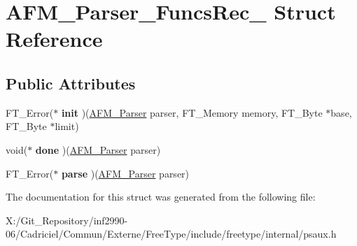 \hypertarget{struct_a_f_m___parser___funcs_rec__}{\section{A\-F\-M\-\_\-\-Parser\-\_\-\-Funcs\-Rec\-\_\- Struct Reference}
\label{struct_a_f_m___parser___funcs_rec__}
}
\subsection*{Public Attributes}
\begin{DoxyCompactItemize}
\item 
\hypertarget{struct_a_f_m___parser___funcs_rec___a7d5c1422c71ef00984f1207ebfb0b082}{F\-T\-\_\-\-Error($\ast$ {\bfseries init} )(\hyperlink{struct_a_f_m___parser_rec__}{A\-F\-M\-\_\-\-Parser} parser, F\-T\-\_\-\-Memory memory, F\-T\-\_\-\-Byte $\ast$base, F\-T\-\_\-\-Byte $\ast$limit)}\label{struct_a_f_m___parser___funcs_rec___a7d5c1422c71ef00984f1207ebfb0b082}

\item 
\hypertarget{struct_a_f_m___parser___funcs_rec___af4e8bc33b14d14b47d13caf0a2449d1b}{void($\ast$ {\bfseries done} )(\hyperlink{struct_a_f_m___parser_rec__}{A\-F\-M\-\_\-\-Parser} parser)}\label{struct_a_f_m___parser___funcs_rec___af4e8bc33b14d14b47d13caf0a2449d1b}

\item 
\hypertarget{struct_a_f_m___parser___funcs_rec___a2cd41be89cf12f9227c6f18220cbe2f3}{F\-T\-\_\-\-Error($\ast$ {\bfseries parse} )(\hyperlink{struct_a_f_m___parser_rec__}{A\-F\-M\-\_\-\-Parser} parser)}\label{struct_a_f_m___parser___funcs_rec___a2cd41be89cf12f9227c6f18220cbe2f3}

\end{DoxyCompactItemize}


The documentation for this struct was generated from the following file\-:\begin{DoxyCompactItemize}
\item 
X\-:/\-Git\-\_\-\-Repository/inf2990-\/06/\-Cadriciel/\-Commun/\-Externe/\-Free\-Type/include/freetype/internal/psaux.\-h\end{DoxyCompactItemize}
